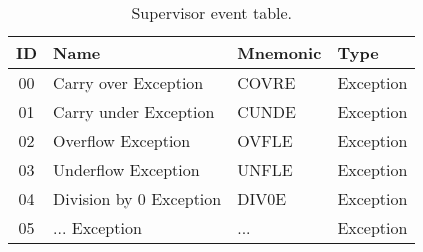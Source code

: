 \begin{table}[hbt!] %

    \begin{center}

    \begin{tabular}{|c|l|l|l|}

        \hline
        ID & Name & Mnemonic & Type \\
        \hline
        00 & Carry over Exception & COVRE & Exception \\
        \hline
        01 & Carry under Exception & CUNDE & Exception \\
        \hline
        02 & Overflow Exception & OVFLE & Exception \\
        \hline
        03 & Underflow Exception & UNFLE & Exception \\
        \hline
        04 & Division by 0 Exception & DIV0E & Exception \\
        \hline
        05 & ... Exception & ... & Exception \\
        \hline

    \end{tabular}

    \caption[Supervisor event table]{Supervisor event table.}

    \end{center}

\end{table}